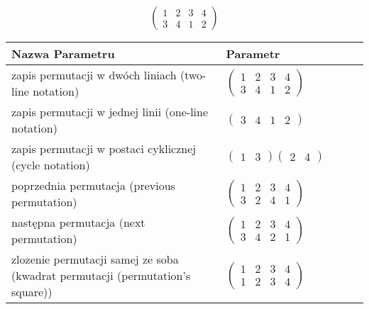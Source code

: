 \documentclass[12pt]{article}
\begin{document}
\subsection{}
\begin{center}
\[
\begin{pmatrix}
	1 & 2 & 3 & 4 \\ 
	3 & 4 & 1 & 2 
\end{pmatrix}
\]

\begin{tabular}{|m{0.6\linewidth}|m{0.4\linewidth}|}
	\hline
	Nazwa Parametru & Parametr \\
	\hline
	zapis permutacji w dwóch liniach (two-line notation) & $\begin{pmatrix} 1 & 2 & 3 & 4 \\ 
3 & 4 & 1 & 2 \end{pmatrix}$ \\ 
	\hline
	zapis permutacji w jednej linii (one-line notation) & $\begin{pmatrix} 3 & 4 & 1 & 2 \end{pmatrix}$ \\ 
	\hline
	zapis permutacji w postaci cyklicznej (cycle notation) & $\begin{pmatrix} 1 & 3 \end{pmatrix} \begin{pmatrix} 2 & 4 \end{pmatrix} $ \\ 
	\hline
	poprzednia permutacja (previous permutation) & $\begin{pmatrix} 1 & 2 & 3 & 4 \\ 
3 & 2 & 4 & 1 \end{pmatrix}$ \\ 
	\hline
	następna permutacja (next permutation) & $\begin{pmatrix} 1 & 2 & 3 & 4 \\ 
3 & 4 & 2 & 1 \end{pmatrix}$ \\ 
	\hline
	zlozenie permutacji samej ze soba (kwadrat permutacji (permutation's square)) & $\begin{pmatrix} 1 & 2 & 3 & 4 \\ 
1 & 2 & 3 & 4 \end{pmatrix}$ \\ 
	\hline
\end{tabular}
\end{center}
\end{document}
